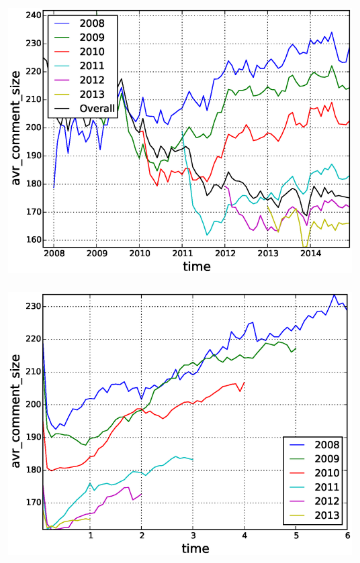 \begin{figure}[!tb]
\centering
\begin{subfigure}{.49\textwidth}\includegraphics[scale=0.4]{./images/avr_comment_size_over_time_cohorts.eps}\caption{}\end{subfigure}
\begin{subfigure}{.49\textwidth}\includegraphics[scale=0.4]{./images/avr_comment_size_cohorts.eps}\caption{}\end{subfigure}
\begin{subfigure}{1\textwidth}

\end{subfigure}
\end{figure}
